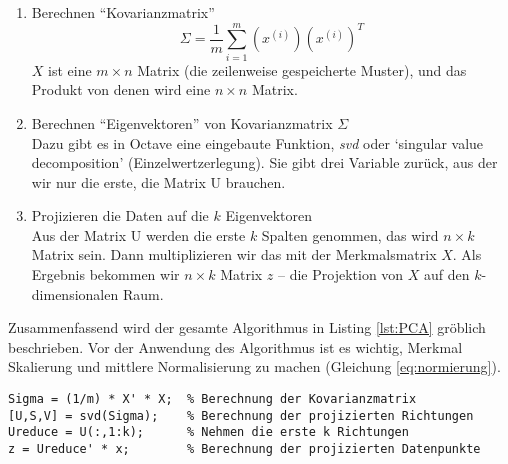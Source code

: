 \begin{enumerate}

\item Berechnen ``Kovarianzmatrix''
\begin{equation}
\Sigma = \frac{1}{m}\sum^m_{i=1}(x^{(i)})(x^{(i)})^T
\end{equation}
$X$ ist eine $m \times n$ Matrix (die zeilenweise gespeicherte Muster), und das Produkt von denen wird eine $n \times n$ Matrix.

\item Berechnen ``Eigenvektoren'' von Kovarianzmatrix $\Sigma$\\
Dazu gibt es in Octave eine eingebaute Funktion, \textit{svd} oder `singular value decomposition' (Einzelwertzerlegung). Sie gibt drei Variable zur\"uck, aus der wir nur die erste, die Matrix U brauchen. 

\item Projizieren die Daten auf die $k$ Eigenvektoren\\
Aus der Matrix U werden die erste $k$ Spalten genommen, das wird $n \times k$ Matrix sein. Dann multiplizieren wir das mit der Merkmalsmatrix $X$. Als Ergebnis bekommen wir $n \times k$ Matrix $z$ -- die Projektion von $X$ auf den $k$-dimensionalen Raum.

\end{enumerate}

Zusammenfassend wird der gesamte Algorithmus in Listing \ref{lst:PCA} gr\"oblich beschrieben. Vor  der Anwendung des Algorithmus ist es wichtig, Merkmal Skalierung und mittlere Normalisierung zu machen (Gleichung \ref{eq:normierung}).

\begin{lstlisting}[caption={PCA Algorithmus},label={lst:PCA}]
Sigma = (1/m) * X' * X;  % Berechnung der Kovarianzmatrix
[U,S,V] = svd(Sigma);    % Berechnung der projizierten Richtungen
Ureduce = U(:,1:k);      % Nehmen die erste k Richtungen
z = Ureduce' * x;        % Berechnung der projizierten Datenpunkte
\end{lstlisting}